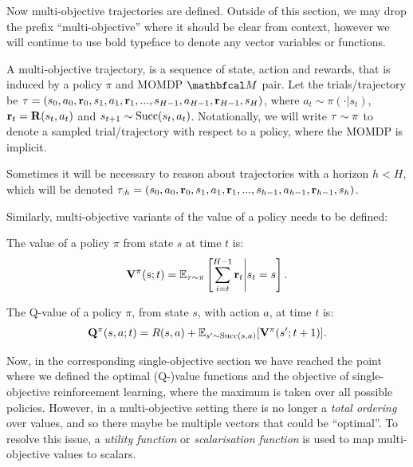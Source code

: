     Now multi-objective trajectories are defined. Outside of this section, we may drop the prefix ``multi-objective'' where it should be clear from context, however we will continue to use bold typeface to denote any vector variables or functions.

    \begin{defn}
        \label{def:mo_trajectory}
        A \textnormal{multi-objective trajectory}, is a sequence of state, action and rewards, that is induced by a policy $\pi$ and MOMDP $\bfcl{M}$ pair. Let the trials/trajectory be $\mathbf{\tau} = (s_0, a_0, \mathbf{r}_0, s_1, a_1, \mathbf{r}_1, ..., s_{H-1}, a_{H-1}, \mathbf{r}_{H-1}, s_H)$, where $a_t \sim \pi(\cdot|s_t)$, $\mathbf{r}_t=\mathbf{R}(s_t,a_t)$ and $s_{t+1} \sim {\textnormal{Succ}(s_t,a_t)}$. Notationally, we will write $\mathbf{\tau}\sim\pi$ to denote a sampled trial/trajectory with respect to a policy, where the MOMDP is implicit.

        Sometimes it will be necessary to reason about trajectories with a horizon $h<H$, which will be denoted $\mathbf{\tau}_{:h} = (s_0, a_0, \mathbf{r}_0, s_1, a_1, \mathbf{r}_1, ..., s_{h-1}, a_{h-1}, \mathbf{r}_{h-1}, s_h)$.
    \end{defn}

    Similarly, multi-objective variants of the value of a policy needs to be defined:    
    \begin{defn}
        \label{def:mo_value}
        \label{def:mo_q_value}
        The \textnormal{value} of a policy $\pi$ from state $s$ at time $t$ is:
        \begin{align}
            \mathbf{V}^{\pi}(s;t) = \mathbb{E}_{\mathbf{\tau}\sim\pi}\left[\sum_{i=t}^{H-1} \mathbf{r}_t \Bigg| s_t=s \right].
        \end{align} 

        The \textnormal{Q-value} of a policy $\pi$, from state $s$, with action $a$, at time $t$ is:
        \begin{align}
            \mathbf{Q}^{\pi}(s,a;t) = R(s,a) + \mathbb{E}_{s'\sim {\textnormal{Succ}(s,a)}} [\mathbf{V}^{\pi}(s';t+1)].
        \end{align} 
    \end{defn}

    Now, in the corresponding single-objective section  we have reached the point where we defined the optimal (Q-)value functions and the objective of single-objective reinforcement learning, where the maximum is taken over all possible policies. However, in a multi-objective setting there is no longer a \textit{total ordering} over values, and so there maybe be multiple vectors that could be ``optimal''. To resolve this issue, a \textit{utility function} or \textit{scalarisation function} is used to map multi-objective values to scalars.


